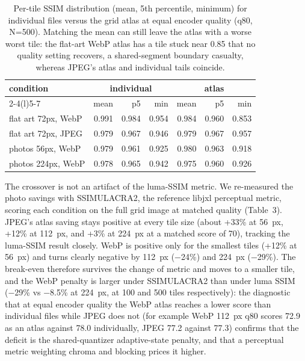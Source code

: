 \documentclass[3p,twocolumn]{elsarticle}
\begin{document}
\begin{table}[t]
\centering
\footnotesize
\setlength{\tabcolsep}{4pt}
\begin{tabular}{@{}l rrr rrr@{}}
\toprule
condition & \multicolumn{3}{c}{individual} & \multicolumn{3}{c}{atlas} \\ \cmidrule(l){2-4}\cmidrule(l){5-7}
& mean & p5 & min & mean & p5 & min \\
\midrule
flat art 72px, WebP & 0.991 & 0.984 & 0.954 & 0.984 & 0.960 & 0.853 \\
flat art 72px, JPEG & 0.979 & 0.967 & 0.946 & 0.979 & 0.967 & 0.957 \\
photos 56px, WebP & 0.979 & 0.961 & 0.925 & 0.980 & 0.963 & 0.918 \\
photos 224px, WebP & 0.978 & 0.965 & 0.942 & 0.975 & 0.960 & 0.926 \\
\bottomrule
\end{tabular}
\caption{Per-tile SSIM distribution (mean, 5th percentile,
minimum) for individual files versus the grid atlas at equal encoder
quality (q80, N=500). Matching the mean can still leave the atlas with a
worse worst tile: the flat-art WebP atlas has a tile stuck near 0.85
that no quality setting recovers, a shared-segment boundary casualty,
whereas JPEG's atlas and individual tails coincide.}

\end{table}


The crossover is not an artifact of the luma-SSIM metric. We re-measured
the photo savings with SSIMULACRA2, the reference libjxl perceptual
metric, scoring each condition on the full grid image at matched quality
(Table~3). JPEG's atlas saving stays positive at every
tile size (about +33\% at 56~px, +12\% at 112~px, and +3\% at 224~px at
a matched score of 70), tracking the luma-SSIM result closely. WebP is
positive only for the smallest tiles (+12\% at 56~px) and turns clearly
negative by 112~px (−24\%) and 224~px (−29\%). The break-even therefore
survives the change of metric and moves to a smaller tile, and the WebP
penalty is larger under SSIMULACRA2 than under luma SSIM (−29\% vs
−8.5\% at 224~px, at 100 and 500 tiles respectively): the diagnostic
that at equal encoder quality the WebP atlas reaches a lower score than
individual files while JPEG does not (for example WebP 112~px q80 scores
72.9 as an atlas against 78.0 individually, JPEG 77.2 against 77.3)
confirms that the deficit is the shared-quantizer adaptive-state
penalty, and that a perceptual metric weighting chroma and blocking
prices it higher.
\end{document}
